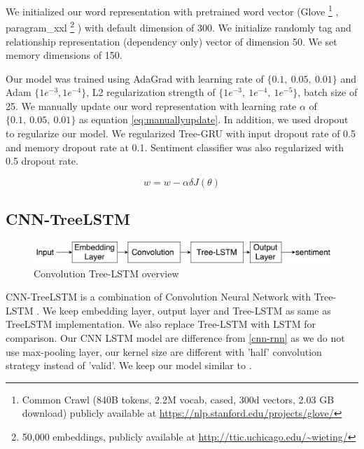 We initialized our word representation with pretrained word vector (Glove \footnote{Common Crawl (840B tokens, 2.2M vocab, cased, 300d vectors, 2.03 GB download) publicly available at \url{https://nlp.stanford.edu/projects/glove/}} \cite{glove}, paragram\_xxl \footnote{50,000 embeddings, publicly available at \url{http://ttic.uchicago.edu/~wieting/}} \cite{wieting2015towards}) with default dimension of 300.  We initialize randomly tag and relationship representation (dependency only) vector of dimension 50. We set memory dimensions of 150. 

Our model was trained using AdaGrad \cite{duchi2011adaptive} with learning rate of $\{0.1,~ 0.05,~ 0.01\}$ and Adam $\{1e^{-3}, 1e^{-4}\}$, L2 regularization strength of $\{1e^{-3},~ 1e^{-4}, ~ 1e^{-5} \}$, batch size of 25. We manually update our word representation with learning rate $\alpha$ of $\{0.1,~0.05, ~0.01\}$ as equation \ref{eq:manuallyupdate}. In addition, we used dropout \cite{krizhevsky2012imagenet} to regularize our model. We regularized Tree-GRU with input dropout rate of 0.5 and memory dropout rate at 0.1. Sentiment classifier was also regularized with 0.5 dropout rate. 


\begin{equation}
\label{eq:manuallyupdate}
w = w - \alpha\delta J(\theta)
\end{equation}


\subsection{CNN-TreeLSTM}\label{sec:CNNtree}

\begin{figure}[H]
	\centering
	\includegraphics[width=0.8\linewidth]{figure/convtreelstmsummary}
	\caption[Convolution Tree-LSTM overview]{Convolution Tree-LSTM overview}
	\label{fig:convtreelstmsummary}
\end{figure}

CNN-TreeLSTM is a combination of Convolution Neural Network with Tree-LSTM \cite{treeLSTM}. We keep embedding layer, output layer and Tree-LSTM as same as TreeLSTM implementation. We also replace Tree-LSTM with LSTM for comparison. Our CNN LSTM model are difference from \ref{cnn-rnn} as we do not use max-pooling layer, our kernel size are different with 'half' convolution strategy instead of 'valid'. We keep our model similar to \cite{treeLSTM}.


